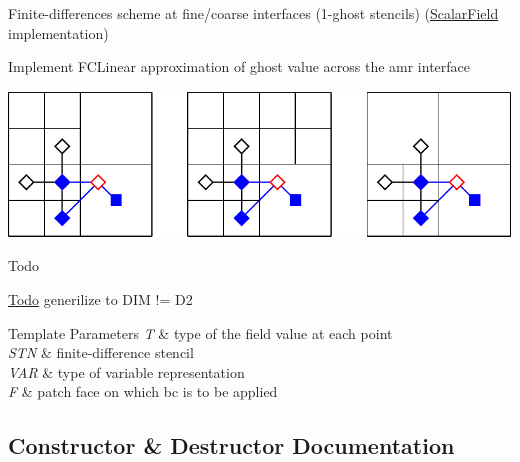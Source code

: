 Finite-\/differences scheme at fine/coarse interfaces (1-\/ghost stencils) (\hyperlink{structUintah_1_1PhaseField_1_1ScalarField}{Scalar\+Field} implementation) 

Implement F\+C\+Linear approximation of ghost value across the amr interface


\begin{DoxyImage}
\includegraphics[width=\textwidth,height=\textheight/2,keepaspectratio=true]{fclinear}
\end{DoxyImage}
 \begin{DoxyRefDesc}{Todo}
\item[\hyperlink{todo__todo000008}{Todo}]generilize to D\+IM != D2\end{DoxyRefDesc}



\begin{DoxyTemplParams}{Template Parameters}
{\em T} & type of the field value at each point \\
\hline
{\em S\+TN} & finite-\/difference stencil \\
\hline
{\em V\+AR} & type of variable representation \\
\hline
{\em F} & patch face on which bc is to be applied \\
\hline
\end{DoxyTemplParams}


\subsection{Constructor \& Destructor Documentation}
\mbox{\label{classUintah_1_1PhaseField_1_1detail_1_1bc__fd_3_01ScalarField_3_01T_01_4_00_01STN_00_01VAR_00_01f836207db876ecd28bf65f631f79030f_af9dcc3019430b6ed799fee1afd92d062}} 

